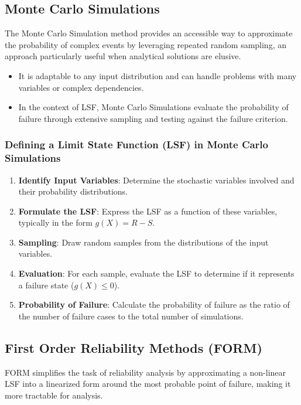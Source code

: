 \subsection*{Monte Carlo Simulations}
The Monte Carlo Simulation method provides an accessible way to approximate the probability of complex events by leveraging repeated random sampling, an approach particularly useful when analytical solutions are elusive.

\begin{itemize}
    \item It is adaptable to any input distribution and can handle problems with many variables or complex dependencies.
    \item In the context of LSF, Monte Carlo Simulations evaluate the probability of failure through extensive sampling and testing against the failure criterion.
\end{itemize}

\subsubsection*{Defining a Limit State Function (LSF) in Monte Carlo Simulations}
\begin{enumerate}
    \item \textbf{Identify Input Variables}: Determine the stochastic variables involved and their probability distributions.
    \item \textbf{Formulate the LSF}: Express the LSF as a function of these variables, typically in the form \( g(X) = R - S \).
    \item \textbf{Sampling}: Draw random samples from the distributions of the input variables.
    \item \textbf{Evaluation}: For each sample, evaluate the LSF to determine if it represents a failure state (\( g(X) \leq 0 \)).
    \item \textbf{Probability of Failure}: Calculate the probability of failure as the ratio of the number of failure cases to the total number of simulations.
\end{enumerate}

\subsection*{First Order Reliability Methods (FORM)}
FORM simplifies the task of reliability analysis by approximating a non-linear LSF into a linearized form around the most probable point of failure, making it more tractable for analysis.

